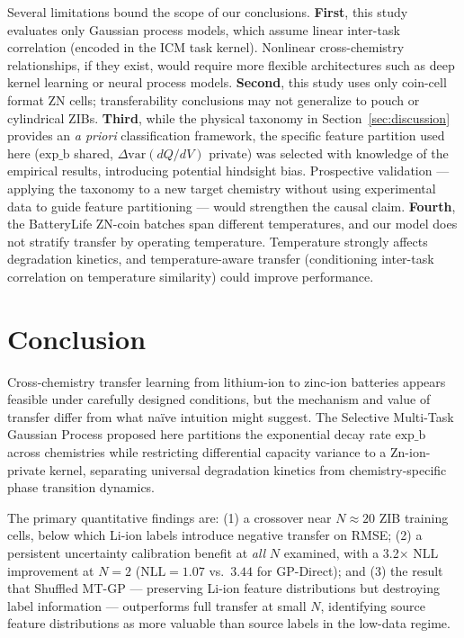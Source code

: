 \documentclass[12pt]{article}
\begin{document}
Several limitations bound the scope of our conclusions. \textbf{First}, this
study evaluates only Gaussian process models, which assume linear inter-task
correlation (encoded in the ICM task kernel). Nonlinear cross-chemistry
relationships, if they exist, would require more flexible architectures such as
deep kernel learning or neural process models. \textbf{Second}, this study uses only coin-cell format ZN cells; transferability conclusions may not generalize to pouch or cylindrical ZIBs. \textbf{Third}, while the physical taxonomy in Section~\ref{sec:discussion} provides an \emph{a priori} classification framework, the specific feature partition used here ($\text{exp\_b}$ shared, $\Delta\mathrm{var}(dQ/dV)$ private) was selected with knowledge of the empirical results, introducing potential hindsight bias. Prospective validation --- applying the taxonomy to a new target chemistry without using experimental data to guide feature partitioning --- would strengthen the causal claim. \textbf{Fourth},
the BatteryLife ZN-coin batches span different temperatures, and our model does
not stratify transfer by operating temperature. Temperature strongly affects
degradation kinetics, and temperature-aware transfer (conditioning inter-task
correlation on temperature similarity) could improve performance.

\section{Conclusion}
\label{sec:conclusion}

Cross-chemistry transfer learning from lithium-ion to zinc-ion batteries appears
feasible under carefully designed conditions, but the mechanism and value of
transfer differ from what na\"ive intuition might suggest. The Selective
Multi-Task Gaussian Process proposed here partitions the exponential decay rate
$\text{exp\_b}$ across chemistries while restricting differential capacity
variance to a Zn-ion-private kernel, separating universal degradation kinetics
from chemistry-specific phase transition dynamics.

The primary quantitative findings are: (1) a crossover near $N \approx 20$
ZIB training cells, below which Li-ion labels introduce negative transfer on
RMSE; (2) a persistent uncertainty calibration benefit at \emph{all} $N$
examined, with a 3.2$\times$ NLL improvement at $N = 2$ ($\mathrm{NLL} = 1.07$
vs.\ $3.44$ for GP-Direct); and (3) the result that Shuffled MT-GP ---
preserving Li-ion feature distributions but destroying label information ---
outperforms full transfer at small $N$, identifying source feature distributions
as more valuable than source labels in the low-data regime.
\end{document}
